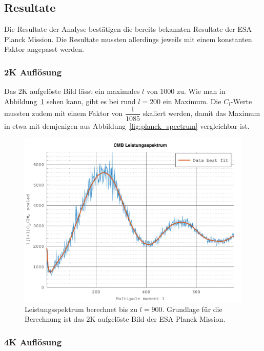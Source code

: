 \subsection{Resultate \label{subsec:cmb:results}}

Die Resultate der Analyse bestätigen die bereits bekannten Resultate der ESA 
Planck Mission. Die Resultate mussten allerdings jeweils mit einem konstanten 
Faktor angepasst werden.

\subsubsection{2K Auflösung}

Das 2K aufgelöste Bild lässt ein maximales $l$ von 1000 zu. Wie man in 
Abbildung~\ref{fig:cmb-power-spec-900} sehen kann, gibt es bei rund $l = 200$ 
ein Maximum. Die $C_l$-Werte mussten zudem mit einem Faktor von 
$\dfrac{1}{1085}$ skaliert werden, damit das Maximum in etwa mit demjenigen aus 
Abbildung~\ref{fig:planck_spectrum} vergleichbar ist.

\begin{figure}
	\centering
	\includegraphics[width=\linewidth]{cmb/data/2k900-500.pdf}
	\caption{Leistungsspektrum berechnet bis zu $l = 900$. Grundlage für die 
		Berechnung ist das 2K aufgelöste Bild der ESA Planck Mission.}
	\label{fig:cmb-power-spec-900}
\end{figure}

\subsubsection{4K Auflösung}

